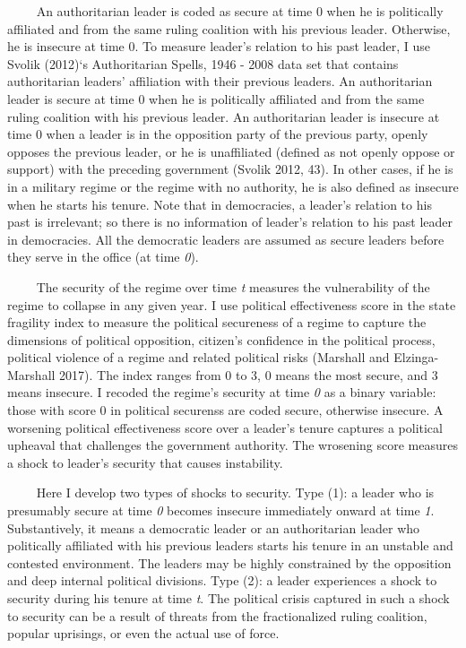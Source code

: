 \documentclass[12pt,]{article}
\begin{document}
\(\qquad\) An authoritarian leader is coded as secure at time 0 when he
is politically affiliated and from the same ruling coalition with his
previous leader. Otherwise, he is insecure at time 0. To measure
leader's relation to his past leader, I use Svolik (2012)`s
Authoritarian Spells, 1946 - 2008 data set that contains authoritarian
leaders' affiliation with their previous leaders. An authoritarian
leader is secure at time 0 when he is politically affiliated and from
the same ruling coalition with his previous leader. An authoritarian
leader is insecure at time 0 when a leader is in the opposition party of
the previous party, openly opposes the previous leader, or he is
unaffiliated (defined as not openly oppose or support) with the
preceding government (Svolik 2012, 43). In other cases, if he is in a
military regime or the regime with no authority, he is also defined as
insecure when he starts his tenure. Note that in democracies, a leader's
relation to his past is irrelevant; so there is no information of
leader's relation to his past leader in democracies. All the democratic
leaders are assumed as secure leaders before they serve in the office
(at time \emph{0}).

\(\qquad\) The security of the regime over time \emph{t} measures the
vulnerability of the regime to collapse in any given year. I use
political effectiveness score in the state fragility index to measure
the political secureness of a regime to capture the dimensions of
political opposition, citizen's confidence in the political process,
political violence of a regime and related political risks (Marshall and
Elzinga-Marshall 2017). The index ranges from 0 to 3, 0 means the most
secure, and 3 means insecure. I recoded the regime's security at time
\emph{0} as a binary variable: those with score 0 in political securenss
are coded secure, otherwise insecure. A worsening political
effectiveness score over a leader's tenure captures a political upheaval
that challenges the government authority. The wrosening score measures a
shock to leader's security that causes instability.

\(\qquad\) Here I develop two types of shocks to security. Type (1): a
leader who is presumably secure at time \emph{0} becomes insecure
immediately onward at time \emph{1}. Substantively, it means a
democratic leader or an authoritarian leader who politically affiliated
with his previous leaders starts his tenure in an unstable and contested
environment. The leaders may be highly constrained by the opposition and
deep internal political divisions. Type (2): a leader experiences a
shock to security during his tenure at time \emph{t}. The political
crisis captured in such a shock to security can be a result of threats
from the fractionalized ruling coalition, popular uprisings, or even the
actual use of force.
\end{document}
